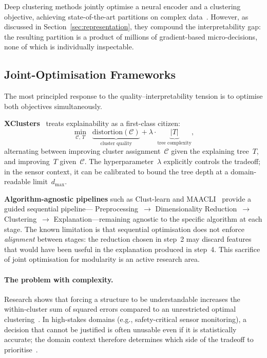 \documentclass{article}
\theoremstyle{plain}
\theoremstyle{definition}
\theoremstyle{remark}
\begin{document}
Deep clustering methods jointly optimise a neural encoder and a
clustering objective, achieving state-of-the-art partitions on complex
data~\cite{aljalbout_clustering_2018}. However, as discussed in
Section~\ref{sec:representation}, they compound the interpretability gap:
the resulting partition is a product of millions of gradient-based
micro-decisions, none of which is individually inspectable.

\subsection{Joint-Optimisation Frameworks}

The most principled response to the quality--interpretability
tension is to optimise both objectives simultaneously.

\textbf{XClusters}~\cite{hwang_xclusters_2023} treats explainability as a first-class
citizen:
\[
  \min_{\mathcal{C},\,T} \;\;
  \underbrace{\mathrm{distortion}(\mathcal{C})}_{\text{cluster quality}}
  + \lambda \cdot \underbrace{|T|}_{\text{tree complexity}},
\]
alternating between improving cluster assignment~$\mathcal{C}$ given the
explaining tree~$T$, and improving~$T$ given~$\mathcal{C}$.
The hyperparameter~$\lambda$ explicitly controls the tradeoff; in the
sensor context, it can be calibrated to bound the tree depth at a
domain-readable limit~$d_{\max}$.

\textbf{Algorithm-agnostic pipelines} such as Clust-learn and
MAACLI~\cite{portugal_framework_2024} provide a guided sequential pipeline---
Preprocessing~$\to$ Dimensionality Reduction~$\to$ Clustering~$\to$
Explanation---remaining agnostic to the specific algorithm at each stage.
The known limitation is that sequential optimisation does not enforce
\emph{alignment} between stages: the reduction chosen in step~2 may
discard features that would have been useful in the explanation produced in step~4. This sacrifice of joint optimisation for modularity is an active research area.

\paragraph{The problem with complexity.}
Research shows that forcing a structure to be understandable increases
the within-cluster sum of squared errors compared to an unrestricted
optimal clustering~\cite{dasgupta_explainable_nodate,frost_exkmc_2020}. In high-stakes domains
(e.g., safety-critical sensor monitoring), a decision that cannot be
justified is often unusable even if it is statistically accurate; the
domain context therefore determines which side of the tradeoff to
prioritise~\cite{schlegel_towards_2025}.
\end{document}
